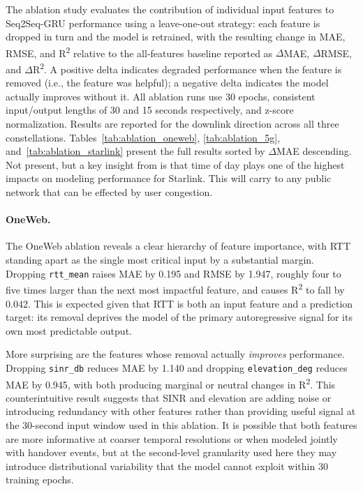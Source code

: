 \documentclass[12pt]{article}
\begin{document}
The ablation study evaluates the contribution of individual input features to Seq2Seq-GRU performance using a leave-one-out strategy: each feature is dropped in turn and the model is retrained, with the resulting change in MAE, RMSE, and R\textsuperscript{2} relative to the all-features baseline reported as $\Delta$MAE, $\Delta$RMSE, and $\Delta$R\textsuperscript{2}. A positive delta indicates degraded performance when the feature is removed (i.e., the feature was helpful); a negative delta indicates the model actually improves without it. All ablation runs use 30 epochs, consistent input/output lengths of 30 and 15 seconds respectively, and z-score normalization. Results are reported for the downlink direction across all three constellations. Tables~\ref{tab:ablation_oneweb}, \ref{tab:ablation_5g}, and~\ref{tab:ablation_starlink} present the full results sorted by $\Delta$MAE descending. Not present, but a key insight from \cite{liu2025vivisecting} is that time of day plays one of the highest impacts on modeling performance for Starlink. This will carry to any public network that can be effected by user congestion.

\paragraph{OneWeb.}
The OneWeb ablation reveals a clear hierarchy of feature importance, with RTT standing apart as the single most critical input by a substantial margin. Dropping \texttt{rtt\_mean} raises MAE by 0.195 and RMSE by 1.947, roughly four to five times larger than the next most impactful feature, and causes R\textsuperscript{2} to fall by 0.042. This is expected given that RTT is both an input feature and a prediction target: its removal deprives the model of the primary autoregressive signal for its own most predictable output.

More surprising are the features whose removal actually \emph{improves} performance. Dropping \texttt{sinr\_db} reduces MAE by 1.140 and dropping \texttt{elevation\_deg} reduces MAE by 0.945, with both producing marginal or neutral changes in R\textsuperscript{2}. This counterintuitive result suggests that SINR and elevation are adding noise or introducing redundancy with other features rather than providing useful signal at the 30-second input window used in this ablation. It is possible that both features are more informative at coarser temporal resolutions or when modeled jointly with handover events, but at the second-level granularity used here they may introduce distributional variability that the model cannot exploit within 30 training epochs.
\end{document}
